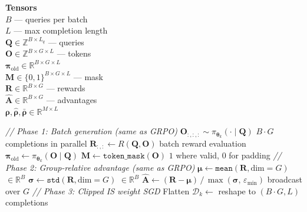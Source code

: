 \documentclass[11pt]{article}
\begin{document}
\begin{algorithm}[p]
\begin{minipage}[t]{0.28\linewidth}
\vspace{6pt}
\textbf{Tensors} \\[2pt]
$B$ --- queries per batch \\
$L$ --- max completion length \\[3pt]
$\mathbf{Q} \in \mathbb{Z}^{B \times L_q}$ --- queries \\
$\mathbf{O} \in \mathbb{Z}^{B \times G \times L}$ --- tokens \\
$\boldsymbol{\pi}_{\text{old}} \in \mathbb{R}^{B \times G \times L}$ \\
$\mathbf{M} \in \{0,1\}^{B \times G \times L}$ --- mask \\
$\mathbf{R} \in \mathbb{R}^{B \times G}$ --- rewards \\
$\hat{\mathbf{A}} \in \mathbb{R}^{B \times G}$ --- advantages \\
$\boldsymbol{\rho}, \hat{\boldsymbol{\rho}}, \bar{\boldsymbol{\rho}} \in \mathbb{R}^{M \times L}$
\end{minipage}%
\hfill
\vrule
\hfill
\begin{minipage}[t]{0.68\linewidth}
\begin{algorithmic}[1]
    \Statex \hspace{\algorithmicindent}\textit{// Phase 1: Batch generation (same as GRPO)}
        \State $\mathbf{O}_{:,:,:} \sim \pi_{\boldsymbol{\theta}_k}(\cdot \mid \mathbf{Q})$ \hfill $B \!\cdot\! G$ completions in parallel
        \State $\mathbf{R}_{:,:} \gets R(\mathbf{Q}, \mathbf{O})$ \hfill batch reward evaluation
        \State $\boldsymbol{\pi}_{\text{old}} \gets \pi_{\boldsymbol{\theta}_k}(\mathbf{O} \mid \mathbf{Q})$
        \State $\mathbf{M} \gets \texttt{token\_mask}(\mathbf{O})$ \hfill $1$ where valid, $0$ for padding
    \EndFor
    \Statex \hspace{\algorithmicindent}\textit{// Phase 2: Group-relative advantage (same as GRPO)}
    \State $\boldsymbol{\mu} \gets \texttt{mean}(\mathbf{R}, \text{dim}=G)$ \hfill $\in \mathbb{R}^{B}$
    \State $\boldsymbol{\sigma} \gets \texttt{std}(\mathbf{R}, \text{dim}=G)$ \hfill $\in \mathbb{R}^{B}$
    \State $\hat{\mathbf{A}} \gets (\mathbf{R} - \boldsymbol{\mu}) \,/\, \max(\boldsymbol{\sigma},\, \varepsilon_{\min})$ \hfill broadcast over $G$
    \Statex \hspace{\algorithmicindent}\textit{// Phase 3: Clipped IS weight SGD}
    \State Flatten $\mathcal{D}_k \gets$ reshape to $(B \!\cdot\! G, L)$ completions

\end{algorithmic}
\end{minipage}
\end{algorithm}
\end{document}
